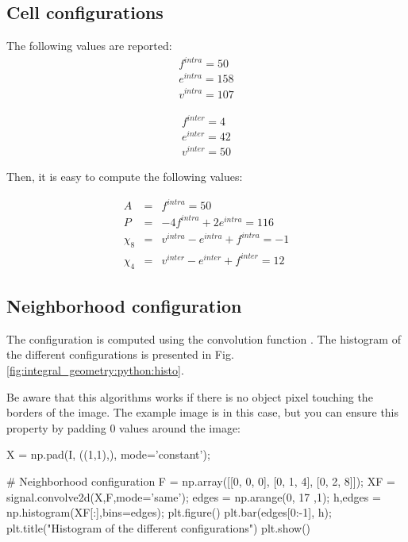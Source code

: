 \def\QRCODE{TB_IPR_TUT.IMG.integral_geometry_pythonqrcode.png}
\def\QRPAGE{http://www.iptutorials.science/tree/master/TB_IPR/TUT.IMG.integral_geometry/python}

\subsection{Cell configurations}

The following values are reported:
\begin{eqnarray*}
 f^{intra}=50 \\
 e^{intra}=158 \\
 v^{intra}=107
\end{eqnarray*}

\begin{eqnarray*}
 f^{inter}=4 \\
 e^{inter}=42 \\
 v^{inter}=50
\end{eqnarray*}

Then, it is easy to compute the following values:

\begin{eqnarray*}
A&=&f^{intra}=50\\
P&=&-4f^{intra}+2e^{intra}=116\\
\chi_8&=&v^{intra}-e^{intra}+f^{intra}=-1\\
\chi_4&=&v^{inter}-e^{inter}+f^{inter}=12
\end{eqnarray*}

\subsection{Neighborhood configuration}

The configuration is computed using the convolution function . The histogram of the different configurations is presented in Fig.\ref{fig:integral_geometry:python:histo}.

Be aware that this algorithms works if there is no object pixel touching the borders of the image. The example image is in this case, but you can ensure this property by padding 0 values around the image:
\begin{python}
X = np.pad(I, ((1,1),), mode='constant');
\end{python}

\begin{python}
# Neighborhood configuration
F = np.array([[0, 0, 0], [0, 1, 4], [0, 2, 8]]);
XF = signal.convolve2d(X,F,mode='same');
edges = np.arange(0, 17 ,1);
h,edges = np.histogram(XF[:],bins=edges);
plt.figure()
plt.bar(edges[0:-1], h);
plt.title("Histogram of the different configurations")
plt.show() 
\end{python}


